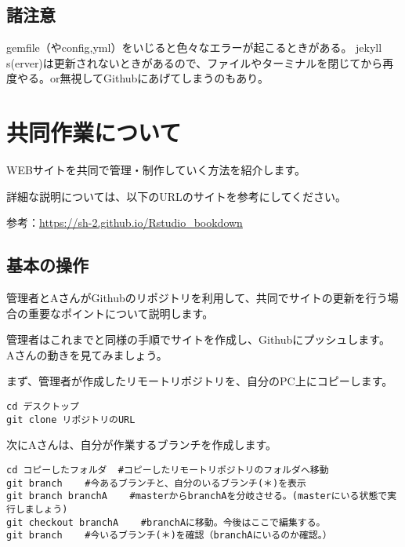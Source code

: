 \documentclass[
]{book}
\begin{document}
\hypertarget{ux8af8ux6ce8ux610f}{%
\section{諸注意}\label{ux8af8ux6ce8ux610f}}

gemfile（やconfig,yml）をいじると色々なエラーが起こるときがある。
jekyll s(erver)は更新されないときがあるので、ファイルやターミナルを閉じてから再度やる。or無視してGithubにあげてしまうのもあり。

\hypertarget{ux5171ux540cux4f5cux696dux306bux3064ux3044ux3066}{%
\chapter{共同作業について}\label{ux5171ux540cux4f5cux696dux306bux3064ux3044ux3066}}

WEBサイトを共同で管理・制作していく方法を紹介します。

詳細な説明については、以下のURLのサイトを参考にしてください。

参考：\url{https://sh-2.github.io/Rstudio_bookdown}

\hypertarget{ux57faux672cux306eux64cdux4f5c}{%
\section{基本の操作}\label{ux57faux672cux306eux64cdux4f5c}}

管理者とAさんがGithubのリポジトリを利用して、共同でサイトの更新を行う場合の重要なポイントについて説明します。

管理者はこれまでと同様の手順でサイトを作成し、Githubにプッシュします。
Aさんの動きを見てみましょう。

まず、管理者が作成したリモートリポジトリを、自分のPC上にコピーします。

\begin{verbatim}
cd デスクトップ
git clone リポジトリのURL
\end{verbatim}

次にAさんは、自分が作業するブランチを作成します。

\begin{verbatim}
cd コピーしたフォルダ  #コピーしたリモートリポジトリのフォルダへ移動
git branch    #今あるブランチと、自分のいるブランチ(＊)を表示
git branch branchA    #masterからbranchAを分岐させる。(masterにいる状態で実行しましょう)
git checkout branchA    #branchAに移動。今後はここで編集する。
git branch    #今いるブランチ(＊)を確認（branchAにいるのか確認。）
\end{verbatim}
\end{document}
